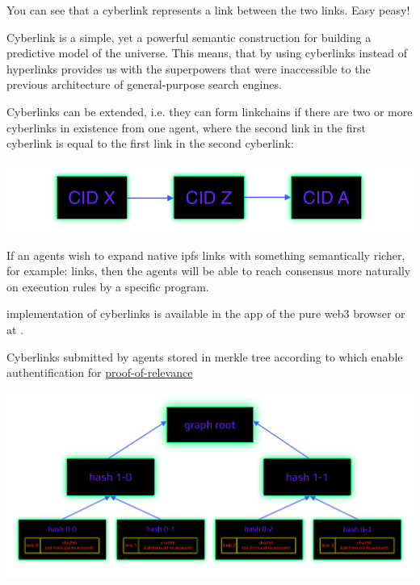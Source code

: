 \documentclass[8pt,oneside]{amsart}
\newcommand{\linkred}[2]{\href{#1}{\color{red}{#2}}}
\newcommand{\linkgreen}[2]{\href{#1}{\color{green}{#2}}}
\newenvironment{Figure}
  {\par\medskip\noindent\minipage{\linewidth}}
  {\endminipage\par\medskip}
\begin{document}
You can see that a cyberlink represents a link between the two links. Easy peasy!

Cyberlink is a simple, yet a powerful semantic construction for building a predictive model of the universe. This means, that by using cyberlinks instead of hyperlinks provides us with the superpowers that were inaccessible to the previous architecture of general-purpose search engines.

Cyberlinks can be extended, i.e. they can form linkchains if there are two or more cyberlinks in existence from one agent, where the second link in the first cyberlink is equal to the first link in the second cyberlink:

\begin{Figure}
    \centering
    \includegraphics[width=1\textwidth]{linkchain.png}
\end{Figure}

If an agents wish to expand native ipfs links with something semantically richer, for example:
\linkred{https://github.com/cybercongress/cyb/blob/dev/docs/dura.md}{dura}
links, then the agents will be able to reach consensus more naturally on execution rules by a specific program.

\linkred{https://github.com/cybercongress/cyberd}{Cyberd} implementation of cyberlinks is available in the \linkred{https://github.com/cybercongress/dot-cyber}{.cyber} app of the pure web3 browser \linkred{https://github.com/cybercongress/cyb}{cyb} or at \linkred{http://cyber.page}{cyber.page}.

Cyberlinks submitted by agents stored in merkle tree according to \linkgreen{https://tools.ietf.org/html/rfc6962#section-2.1}{RFC-6962 standard} which enable authentification for {\hyperref[proof-of-relevance]{proof-of-relevance}}

\begin{Figure}
    \centering
    \includegraphics[width=1\textwidth]{graph-tree.png}
\end{Figure}
\end{document}
